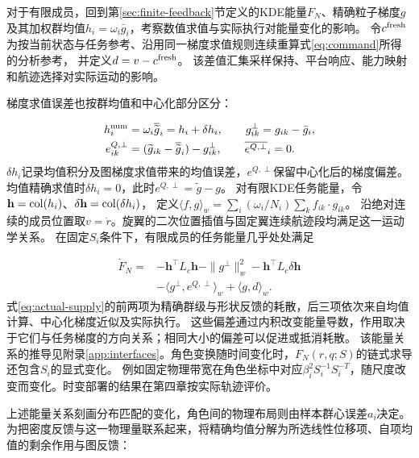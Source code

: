 \documentclass[UTF8,a4paper,11pt,fontset=none]{ctexart}
\begin{document}
对于有限成员，回到第\ref{sec:finite-feedback}节定义的KDE能量$F_N$、精确粒子梯度$g$及其加权群均值$h_i=\omega_i\bar g_i$，考察数值求值与实际执行对能量变化的影响。
令$c^{\rm fresh}$为按当前状态与任务参考、沿用同一梯度求值规则连续重算式\eqref{eq:command}所得的分析参考，
并定义$d=v-c^{\rm fresh}$。
该差值汇集采样保持、平台响应、能力映射和航迹选择对实际运动的影响。

梯度求值误差也按群均值和中心化部分区分：

\begin{equation}
\begin{aligned}
h_i^{\rm num}&=\omega_i\overline{\widetilde g}_i=h_i+\delta h_i,\qquad
g^\perp_{ik}=g_{ik}-\bar g_i,\\
e^{Q,\perp}_{ik}&=(\widetilde g_{ik}-\overline{\widetilde g}_i)-g^\perp_{ik},
\qquad\overline{e^{Q,\perp}}_i=0.
\end{aligned}
\label{eq:gradient-errors}
\end{equation}
$\delta h_i$记录均值积分及图梯度求值带来的均值误差，$e^{Q,\perp}$保留中心化后的梯度偏差。
均值精确求值时$\delta h_i=0$，此时$e^{Q,\perp}=\widetilde g-g$。
对有限KDE任务能量，令$\mathbf h=\operatorname{col}(h_i)$、$\delta\mathbf h=\operatorname{col}(\delta h_i)$，
定义$\langle f,g\rangle_w=\sum_i(\omega_i/N_i)\sum_kf_{ik}\cdot g_{ik}$。
沿绝对连续的成员位置取$v=\dot r$。旋翼的二次位置插值与固定翼连续航迹段均满足这一运动学关系。
在固定$S_i$条件下，有限成员的任务能量几乎处处满足

\begin{equation}
\begin{aligned}
\dot F_N={}&-\mathbf h^\top L_c\mathbf h-\|g^\perp\|_w^2
-\mathbf h^\top L_c\delta\mathbf h\\
&-\langle g^\perp,e^{Q,\perp}\rangle_w+\langle g,d\rangle_w .
\end{aligned}
\label{eq:actual-supply}
\end{equation}
式\eqref{eq:actual-supply}的前两项为精确群级与形状反馈的耗散，后三项依次来自均值计算、中心化梯度近似及实际执行。
这些偏差通过内积改变能量导数，作用取决于它们与任务梯度的方向关系；相同大小的偏差可以促进或抵消耗散。
该能量关系的推导见附录\ref{app:interfaces}。角色变换随时间变化时，$F_N(r,q;S)$的链式求导还包含$S_i$的显式变化。
例如固定物理带宽在角色坐标中对应$\beta_i^2 S_i^{-1}S_i^{-T}$，随尺度改变而变化。时变部署的结果在第四章按实际轨迹评价。

上述能量关系刻画分布匹配的变化，角色间的物理布局则由样本群心误差$a_i$决定。
为把密度反馈与这一物理量联系起来，将精确均值分解为所选线性位移项、自项均值的剩余作用与图反馈：
\end{document}
